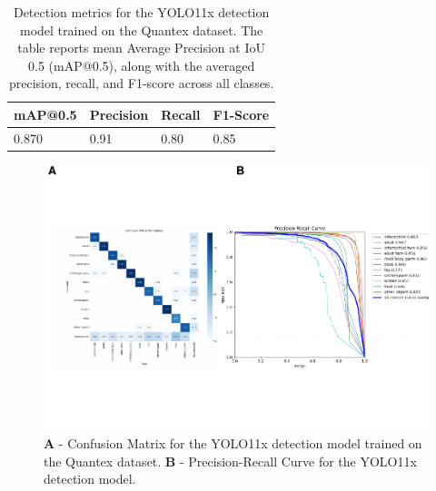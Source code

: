 \documentclass[
  man,floatsintext]{apa6}
\begin{document}
\begin{table}[tbp]

\begin{center}
\begin{threeparttable}

\caption{\label{tab:det-detection-metrics-detailed}Detection metrics for the YOLO11x detection model trained on the Quantex dataset. The table reports mean Average Precision at IoU 0.5 (mAP@0.5), along with the averaged precision, recall, and F1-score across all classes.}

\begin{tabular}{llll}
\toprule
mAP@0.5 & \multicolumn{1}{c}{Precision} & \multicolumn{1}{c}{Recall} & \multicolumn{1}{c}{F1-Score}\\
\midrule
0.870 & 0.91 & 0.80 & 0.85\\
\bottomrule
\end{tabular}

\end{threeparttable}
\end{center}

\end{table}

\begin{figure}

{\centering \includegraphics{Quantex_interaction_paper_files/figure-latex/det-metrics-1} 

}

\caption{\textbf{A} - Confusion Matrix for the YOLO11x detection model trained on the Quantex dataset. \textbf{B} - Precision-Recall Curve for the YOLO11x detection model.}\label{fig:det-metrics}
\end{figure}
\end{document}
